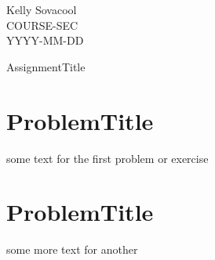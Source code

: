 \documentclass[12pt]{article}
\begin{document}
\begin{flushleft}
Kelly Sovacool\\
COURSE-SEC\\
YYYY-MM-DD\\
\end{flushleft}

\begin{center}
\LARGE{AssignmentTitle}
\end{center}

\section{ProblemTitle}
some text for the first problem or exercise

\section{ProblemTitle}
some more text for another
\end{document}
